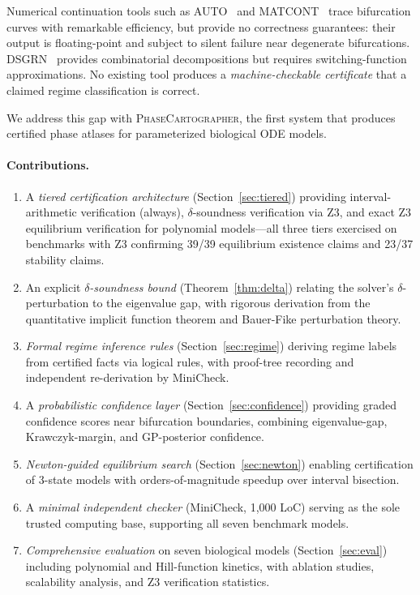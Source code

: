 \documentclass[11pt]{article}
\newcommand{\PC}{\textsc{PhaseCartographer}}
\begin{document}
Numerical continuation tools such as AUTO~\cite{doedel2007auto} and MATCONT~\cite{dhooge2008matcont} trace bifurcation curves with remarkable efficiency, but provide no correctness guarantees: their output is floating-point and subject to silent failure near degenerate bifurcations.
DSGRN~\cite{cummins2016dsgrn} provides combinatorial decompositions but requires switching-function approximations.
No existing tool produces a \emph{machine-checkable certificate} that a claimed regime classification is correct.

We address this gap with \PC{}, the first system that produces certified phase atlases for parameterized biological ODE models.

\paragraph{Contributions.}
\begin{enumerate}[leftmargin=*]
\item A \emph{tiered certification architecture} (Section~\ref{sec:tiered}) providing interval-arithmetic verification (always), $\delta$-soundness verification via Z3, and exact Z3 equilibrium verification for polynomial models---all three tiers exercised on benchmarks with Z3 confirming 39/39 equilibrium existence claims and 23/37 stability claims.

\item An explicit \emph{$\delta$-soundness bound} (Theorem~\ref{thm:delta}) relating the solver's $\delta$-perturbation to the eigenvalue gap, with rigorous derivation from the quantitative implicit function theorem and Bauer-Fike perturbation theory.

\item \emph{Formal regime inference rules} (Section~\ref{sec:regime}) deriving regime labels from certified facts via logical rules, with proof-tree recording and independent re-derivation by MiniCheck.

\item A \emph{probabilistic confidence layer} (Section~\ref{sec:confidence}) providing graded confidence scores near bifurcation boundaries, combining eigenvalue-gap, Krawczyk-margin, and GP-posterior confidence.

\item \emph{Newton-guided equilibrium search} (Section~\ref{sec:newton}) enabling certification of 3-state models with orders-of-magnitude speedup over interval bisection.

\item A \emph{minimal independent checker} (MiniCheck, 1,000 LoC) serving as the sole trusted computing base, supporting all seven benchmark models.

\item \emph{Comprehensive evaluation} on seven biological models (Section~\ref{sec:eval}) including polynomial and Hill-function kinetics, with ablation studies, scalability analysis, and Z3 verification statistics.
\end{enumerate}
\end{document}
